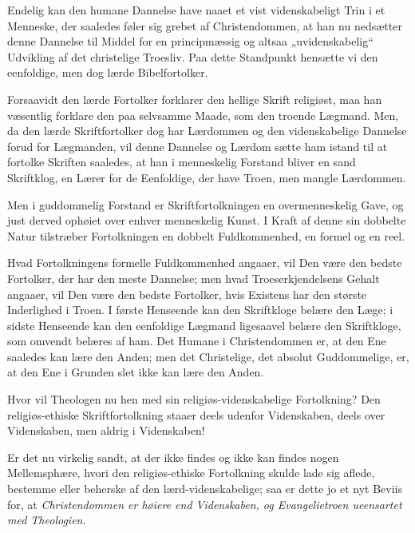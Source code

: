 \documentclass[12pt,a4paper]{book}
\newcommand{\opage}[1]{\marginnote{\footnotesize\textit{[#1]}}}
\begin{document}
Endelig kan den humane Dannelse have naaet et vist videnskabeligt Trin i
et Menneske, der saaledes føler sig grebet af Christendommen, at han nu
nedsætter denne Dannelse til Middel for en principmæssig og altsaa
„uvidenskabelig“ Udvikling af det christelige Troesliv. Paa dette
Standpunkt hensætte vi den eenfoldige, men dog lærde Bibelfortolker.

Forsaavidt den lærde Fortolker forklarer den hellige Skrift religiøst,
maa han væsentlig forklare den paa selvsamme Maade, som den troende
Lægmand. Men, da den lærde Skriftfortolker dog har Lærdommen og den
videnskabelige Dannelse forud for
\opage{65} Lægmanden, vil denne Dannelse og Lærdom sætte ham istand til at fortolke
Skriften saaledes, at han i menneskelig Forstand bliver en sand
Skriftklog, en Lærer for de Eenfoldige, der have Troen, men mangle
Lærdommen.

Men i guddommelig Forstand er Skriftfortolkningen en overmenneskelig
Gave, og just derved ophøiet over enhver menneskelig Kunst. I Kraft af
denne sin dobbelte Natur tilstræber Fortolkningen en dobbelt
Fuldkommenhed, en formel og en reel.

Hvad Fortolkningens formelle Fuldkommenhed angaaer, vil Den være den
bedste Fortolker, der har den meste Dannelse; men hvad Troeserkjendelsens
Gehalt angaaer, vil Den være den bedste Fortolker, hvis Existens har den
største Inderlighed i Troen. I første Henseende kan den Skriftkloge
belære den Læge; i sidste Henseende kan den eenfoldige Lægmand ligesaavel
belære den Skriftkloge, som omvendt belæres af ham. Det Humane i
Christendommen er, at den Ene saaledes kan lære den Anden; men det
Christelige, det absolut Guddommelige, er, at den Ene i Grunden slet ikke
kan lære den Anden.

Hvor vil Theologen nu hen med sin religiøs-videnskabelige Fortolkning?
Den religiøs-ethiske Skriftfortolkning staaer deels udenfor Videnskaben,
deels over Videnskaben, men aldrig i Videnskaben!

Er det nu virkelig sandt, at der ikke findes og ikke kan findes nogen
Mellemsphære, hvori den religiøs-ethiske Fortolkning skulde lade sig
aflede, bestemme eller beherske af den lærd-videnskabelige; saa er dette
jo et nyt Beviis for, at \emph{Christendommen er høiere end Videnskaben,
og Evangelietroen ueensartet med Theologien.}

\end{document}
